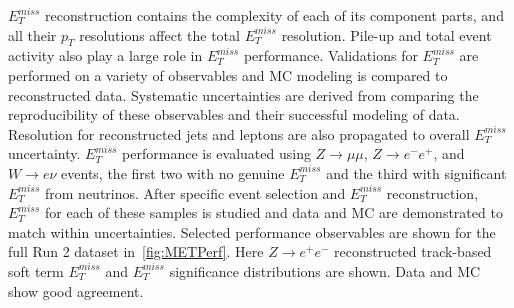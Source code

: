 $E_T^{miss}$ reconstruction contains the complexity of each of its component parts, and all their $p_T$ resolutions affect the total $E_T^{miss}$ resolution. Pile-up and total event activity also play a large role in $E_T^{miss}$ performance. Validations for $E_T^{miss}$ are performed on a variety of observables and MC modeling is compared to reconstructed data. Systematic uncertainties are derived from comparing the reproducibility of these observables and their successful modeling of data. Resolution for reconstructed jets and leptons are also propagated to overall $E_T^{miss}$ uncertainty. $E_T^{miss}$ performance is evaluated using $Z\rightarrow \mu\mu$, $Z\rightarrow e^-e^+$, and $W\rightarrow e\nu$ events, the first two with no genuine $E_T^{miss}$ and the third with significant $E_T^{miss}$ from neutrinos. After specific event selection and $E_T^{miss}$ reconstruction, $E_T^{miss}$ for each of these samples is studied and data and MC are demonstrated to match within uncertainties. Selected performance observables are shown for the full Run 2 dataset in~\ref{fig:METPerf}. Here $Z\rightarrow e^+e^-$ reconstructed track-based soft term $E_T^{miss}$ and $E_T^{miss}$ significance distributions are shown. Data and MC show good agreement.

